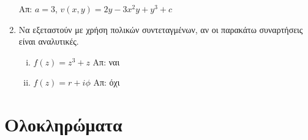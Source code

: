 \begin{enumerate}
    \hfill Απ: $ a=3 $, $ v(x,y) = 2y-3x^{2}y+y^{3}+c $ 

  \item Να εξεταστούν με χρήση πολικών συντεταγμένων, αν οι παρακάτω συναρτήσεις είναι
    αναλυτικές. 
    \begin{enumerate}[i)]
      \item $ f(z)=z^{3}+z $ \hfill Απ: ναι 
      \item $ f(z) = r + i \phi $ \hfill Απ: όχι 
    \end{enumerate} 
\end{enumerate}


\section*{Ολοκληρώματα}

